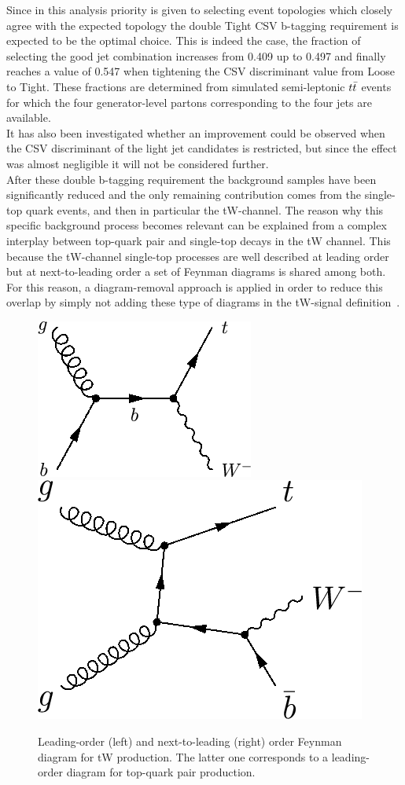 Since in this analysis priority is given to selecting event topologies which closely agree with the expected topology the double Tight CSV b-tagging requirement is expected to be the optimal choice.
This is indeed the case, the fraction of selecting the good jet combination increases from 0.409 up to 0.497 and finally reaches a value of 0.547 when tightening the CSV discriminant value from Loose to Tight. 
These fractions are determined from simulated semi-leptonic $t\bar{t}$ events for which the four generator-level partons corresponding to the four jets are available.
\\
It has also been investigated whether an improvement could be observed when the CSV discriminant of the light jet candidates is restricted, but since the effect was almost negligible it will not be considered further.
\\

After these double b-tagging requirement the background samples have been significantly reduced and the only remaining contribution comes from the single-top quark events, and then in particular the tW-channel.
The reason why this specific background process becomes relevant can be explained from a complex interplay between top-quark pair and single-top decays in the tW channel. This because the tW-channel single-top processes are well described at leading order but at next-to-leading order a set of Feynman diagrams is shared among both.
For this reason, a diagram-removal approach is applied in order to reduce this overlap by simply not adding these type of diagrams in the tW-signal definition~\cite{DRST}.
\begin{figure}[h!t]
 \centering
 \includegraphics[width = 0.3 \textwidth]{Chapters/Chapter4_EvtSel/Figures/STtW_LO.png} \hspace{0.5cm}
 \includegraphics[width = 0.3 \textwidth]{Chapters/Chapter4_EvtSel/Figures/STtW_NLO.png}
 \caption{Leading-order (left) and next-to-leading (right) order Feynman diagram for tW production. The latter one corresponds to a leading-order diagram for top-quark pair production.} \label{fig::STtW}
\end{figure}

